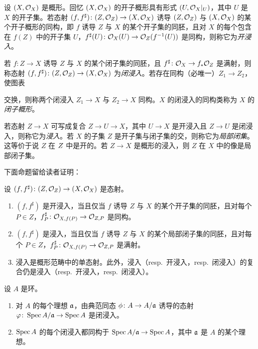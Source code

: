 设 $(X,\mathcal{O}_X)$ 是概形。回忆 $(X,\mathcal{O}_X)$ 的开子概形具有形式 $(U,\mathcal{O}_X|_U)$，其中 $U$ 是 $X$ 的开子集。若态射 $(f,f^\sharp)\colon (Z,\mathcal{O}_Z)\to (X,\mathcal{O}_X)$ 诱导 $(Z,\mathcal{O}_Z)$ 与 $(X,\mathcal{O}_X)$ 的某个开子概形的同构，即 $f$ 诱导 $Z$ 与 $X$ 的某个开子集的同胚，且对 $X$ 的每个包含在 $f(Z)$ 中的开子集 $U$，$f^\sharp(U)\colon \mathcal{O}_X(U)\to \mathcal{O}_Z(f^{-1}(U))$ 是同构，则称它为\emph{开浸入}。

若 $f\colon Z\to X$ 诱导 $Z$ 与 $X$ 的某个闭子集的同胚，且 $f^\sharp\colon \mathcal{O}_X\to f_*\mathcal{O}_Z$ 是满射，则称态射 $(f,f^\sharp)\colon (Z,\mathcal{O}_Z)\to (X,\mathcal{O}_X)$ 为\emph{闭浸入}。若存在同构（必唯一）$Z_1\to Z_2$，使图表
\begin{center}
\end{center}
交换，则称两个闭浸入 $Z_1\to X$ 与 $Z_2\to X$ 同构。$X$ 的闭浸入的同构类称为 $X$ 的\emph{闭子概形}。

若态射 $Z\to X$ 可写成复合 $Z\to U\to X$，其中 $U\to X$ 是开浸入且 $Z\to U$ 是闭浸入，则称它为\emph{浸入}。若 $X$ 的子集 $Z$ 是开子集与闭子集的交，则称它为\emph{局部闭集}。这等价于说 $Z$ 在 $Z$ 中是开的。若 $Z\to X$ 是概形的浸入，则 $Z$ 在 $X$ 中的像是局部闭子集。

下面命题留给读者证明：

\begin{proposition}\label{it:1.3.15}
设 $(f,f^\sharp)\colon (Z,\mathcal{O}_Z)\to (X,\mathcal{O}_X)$ 是态射。
\begin{enumerate}[label=(\roman*),leftmargin=2.8em]
  \item $(f,f^\sharp)$ 是开浸入，当且仅当 $f$ 诱导 $Z$ 与 $X$ 的某个开子集的同胚，且对每个 $P\in Z$，$f^\sharp_P\colon \mathcal{O}_{X,f(P)}\to \mathcal{O}_{Z,P}$ 是同构。
  \item $(f,f^\sharp)$ 是浸入，当且仅当 $f$ 诱导 $Z$ 与 $X$ 的某个局部闭子集的同胚，且对每个 $P\in Z$，$f^\sharp_P\colon \mathcal{O}_{X,f(P)}\to \mathcal{O}_{Z,P}$ 是满射。
  \item 浸入是概形范畴中的单态射。此外，浸入（resp.\ 开浸入，resp.\ 闭浸入）的复合仍是浸入（resp.\ 开浸入，resp.\ 闭浸入）。
\end{enumerate}
\end{proposition}

\begin{proposition}\label{it:1.3.16}
设 $A$ 是环。
\begin{enumerate}[label=(\roman*),leftmargin=2.8em]
  \item 对 $A$ 的每个理想 $\mathfrak{a}$，由典范同态 $\phi\colon A\to A/\mathfrak{a}$ 诱导的态射 $\varphi\colon \operatorname{Spec} A/\mathfrak{a}\to \operatorname{Spec} A$ 是闭浸入。
  \item $\operatorname{Spec} A$ 的每个闭浸入都同构于 $\operatorname{Spec} A/\mathfrak{a}\to \operatorname{Spec} A$，其中 $\mathfrak{a}$ 是 $A$ 的某个理想。
\end{enumerate}
\end{proposition}

